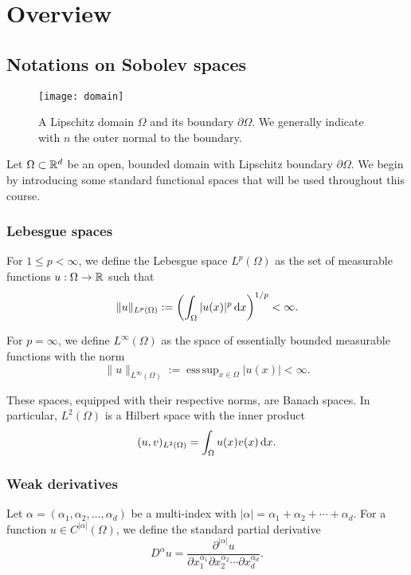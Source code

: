 
\chapter[Overview]{Overview}

\section{Notations on Sobolev spaces}
\label{sec:sobolev_notations}

\begin{figure}[!ht]
  \centering
  \texttt{[image: domain]}
  \caption{A Lipschitz domain $\Omega$ and its boundary $\partial\Omega$. We generally indicate with $n$ the outer normal to the boundary.}
  \label{fig:domain}
\end{figure}

Let $\Omega \subset \mathbb{R}^d$ be an open, bounded domain with Lipschitz boundary $\partial\Omega$. We begin by introducing some standard functional spaces that will be used throughout this course.

\subsection{Lebesgue spaces}

For $1 \leq p < \infty$, we define the Lebesgue space $L^p(\Omega)$ as the set of measurable functions $u: \Omega \to \mathbb{R}$ such that
\[
\|u\|_{L^p(\Omega)} := \left(\int_\Omega |u(x)|^p \mathop{}\!\mathrm{d} x \right)^{1/p} < \infty.
\]

For $p = \infty$, we define $L^\infty(\Omega)$ as the space of essentially bounded measurable functions with the norm
\[
\|u\|_{L^\infty(\Omega)} := \operatorname{ess\,sup}_{x \in \Omega} |u(x)| < \infty.
\]

These spaces, equipped with their respective norms, are Banach spaces. In particular, $L^2(\Omega)$ is a Hilbert space with the inner product
\[
(u, v)_{L^2(\Omega)} = \int_\Omega u(x) v(x) \mathop{}\!\mathrm{d} x.
\]

\subsection{Weak derivatives}

Let $\alpha = (\alpha_1, \alpha_2, \ldots, \alpha_d)$ be a multi-index with $|\alpha| = \alpha_1 + \alpha_2 + \cdots + \alpha_d$. For a function $u \in C^{|\alpha|}(\Omega)$, we define the standard partial derivative
\[
D^\alpha u = \frac{\partial^{|\alpha|} u}{\partial x_1^{\alpha_1} \partial x_2^{\alpha_2} \cdots \partial x_d^{\alpha_d}}.
\]

